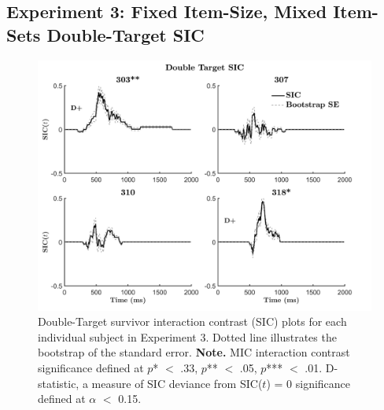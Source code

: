 \subsection{Experiment 3: Fixed Item-Size, Mixed Item-Sets Double-Target SIC}
\begin{figure}[htb]
\begin{center}
\includegraphics[width=\linewidth]{Figures/Appendix/FIG25PNG.png}
\caption{Double-Target survivor interaction contrast (SIC) plots for each individual subject in Experiment 3. Dotted line illustrates the bootstrap of the standard error.\newline
\textbf{Note.} MIC interaction contrast significance defined at $p$* $<$ .33, $p$** $<$ .05, $p$*** $<$ .01. D-statistic, a measure of SIC deviance from SIC($t$) = 0 significance defined at $\alpha$ $<$ 0.15.}
\label{fig:Indiv_SIC_AB_Ex3}
\end{center}
\end{figure}
\newpage

